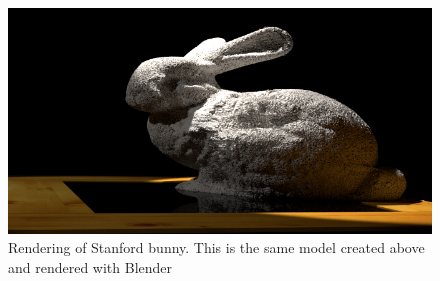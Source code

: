 \begin{figure}[htb] %
   \centering
   \includegraphics[width=0.90\linewidth]{images/bunnyRendered.png}\hfill
   \caption[Rendering of Stanford bunny]{Rendering of Stanford bunny. This is the same model created above and rendered with Blender}
   \label{fig:renderedBunny}
\end{figure}